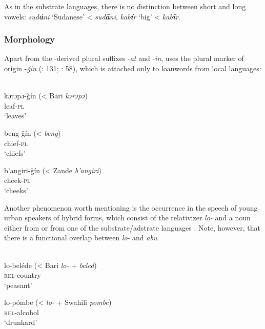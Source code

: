 \documentclass[output=paper]{langsci/langscibook}
\begin{document}
As in the {substrate} languages, there is no distinction between short and long vowels:   \textit{sud\textbf{á}ni} ‘{Sudanese}’ <  \textit{sud\textbf{ā}nī},  \textit{kab\textbf{í}r} ‘big’ <  \textit{kab\textbf{ī}r}.


 \subsubsection{Morphology}

Apart from the -derived plural suffixes -\textit{at} and -\textit{in},   uses the plural marker of  origin -\textit{ǧín} (\citealt{Nakao2012}: 131; \citealt{Manfredi2014plural}: 58), which is attached only to {loanwords} from local languages:


\ea
{  \citep[58]{Manfredi2014plural}}\\
\ea
\gll kɔrɔpɔ-ǧín (\textup{< Bari} \textit{kɔrɔpɔ})\\
    leaf-\textsc{pl}\\
\glt       `leaves' 

\ex
\gll beng-ǧín (<  \textit{beng}) \\
         chief-\textsc{pl}\\
\glt       `chiefs'


\ex
\gll  b'angiri-ǧín (< \textup{Zande} \textit{b'angiri}) \\
         cheek\textsc{-pl}\\
\glt       `cheeks' 
\z
\z

Another phenomenon worth mentioning is the occurrence in the speech of young urban speakers of hybrid forms, which consist of the  {relativizer} \textit{lo-} and a noun either from  or from one of the {substrate}/{adstrate} languages \citep[131]{Nakao2012}. Note, however, that there is a functional overlap between  \textit{lo}- and   \textit{abu}.

\ea\label{lo}
{  \citep[46]{Manfredi2017}}\\
\ea\gll lo-beléde (\textup{< Bari} \textit{lo-} \textup{+ } \textit{beled})\\
\textsc{rel}-country\\
\glt       `peasant'

\ex
\gll lo-pómbe (<  \textit{lo-} + \textup{Swahili} \textit{pombe})\\
 \textsc{rel}-alcohol\\
\glt    `drunkard'
\z
\z
\end{document}
